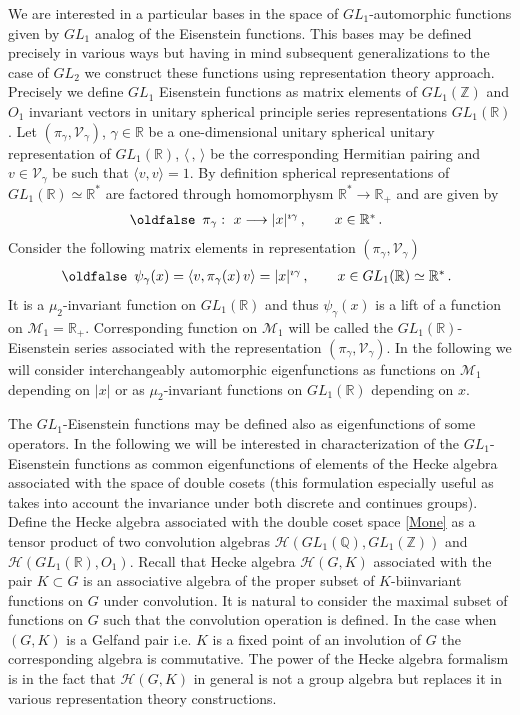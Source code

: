\documentclass[12pt]{article}
\def\IQ{\mathbb{Q}}
\def\IR{\mathbb{R}}
\def\IZ{\mathbb{Z}}
\def\CH {\mathcal{H}}
\def\CM {\mathcal{M}}
\def\CV {\mathcal{V}}
\def\<{\langle}
\def\>{\rangle}
\def\be{\begin{eqnarray}\new\begin{array}{cc}}
\def\ee{\end{array}\end{eqnarray}}
\newcounter{pac}[section]
\begin{document}
We are interested in a particular bases in the
space of $GL_1$-automorphic functions given by $GL_1$ analog of the Eisenstein
functions. This bases may be defined precisely in various ways
but having in mind  subsequent
generalizations to the case of $GL_2$ we  construct these functions
using  representation theory approach. Precisely we define $GL_1$
Eisenstein functions   as  matrix elements of
$GL_1(\IZ)$ and $O_1$ invariant vectors in unitary spherical principle series
 representations $GL_1(\IR)$.
Let $(\pi_\gamma,\CV_\gamma)$, $\gamma\in \IR$ be a  one-dimensional unitary spherical
unitary representation of
$GL_1(\IR)$, $\<\,,\,\>$ be the corresponding
 Hermitian pairing  and  $v\in \CV_{\gamma}$ be such that
$\<v,v\>=1$. By definition   spherical representations of
$GL_1(\IR)\simeq \IR^*$ are  factored through homomorphysm $\IR^* \to
\IR_+$ and are  given  by
\be\label{RepGL1}
\pi_\gamma:\,\,x\longrightarrow |x|^{\imath \gamma}\,, \qquad x\in \IR^*\,.
\ee
Consider the following matrix elements  in representation $(\pi_\gamma,\CV_\gamma)$
\be \label{ME1}
\psi_\gamma(x)=\<v,\pi_\gamma(x)\,v\>=|x|^{\imath \gamma}\,, \qquad
x\in GL_1(\IR)\simeq \IR^*\,.
\ee
It is a $\mu_2$-invariant  function  on $GL_1(\IR)$ and
thus $\psi_\gamma(x)$ is a lift of a function on $\CM_1=\IR_+$. Corresponding function
on $\CM_1$ will be called  the $GL_1(\IR)$-Eisenstein series
associated with the representation $(\pi_\gamma,\CV_\gamma)$.
In the following we will consider
interchangeably automorphic eigenfunctions as functions on $\CM_1$
depending on $|x|$ or as $\mu_2$-invariant functions on $GL_1(\IR)$
depending on $x$.

The  $GL_1$-Eisenstein functions  may be defined also as
eigenfunctions  of some operators. In the following we will be interested
in characterization of the $GL_1$-Eisenstein functions  as common eigenfunctions
of elements of the Hecke algebra associated with the space of double
cosets (this formulation especially useful as
takes into account the invariance under both  discrete and
continues groups). Define the Hecke
algebra associated with the double coset space  \eqref{Mone} as
 a tensor product of two convolution algebras
 $\CH(GL_1(\IQ),GL_1(\IZ))$ and $\CH(GL_1(\IR),O_1)$.
Recall that Hecke algebra $\CH(G,K)$ associated with the pair
$K\subset G$ is an associative algebra of the proper subset of
$K$-biinvariant functions on $G$  under convolution. It is natural to
consider the maximal subset of functions on $G$ such that the
convolution operation is defined. In the case when $(G,K)$ is a
Gelfand pair i.e. $K$ is a fixed point of an involution of $G$ the
corresponding algebra is commutative. The power of the Hecke algebra
formalism is in the fact that $\CH(G,K)$ in general is not a group
algebra but replaces it in various representation theory
constructions.
\end{document}
